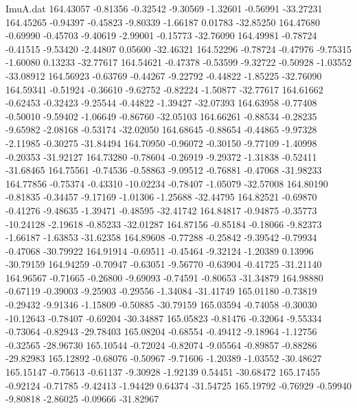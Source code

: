 \begin{filecontents}{ImuA.dat}
 164.43057   -0.81356   -0.32542   -9.30569   -1.32601   -0.56991  -33.27231
 164.45265   -0.94397   -0.45823   -9.80339   -1.66187    0.01783  -32.85250
 164.47680   -0.69990   -0.45703   -9.40619   -2.99001   -0.15773  -32.76090
 164.49981   -0.78724   -0.41515   -9.53420   -2.44807    0.05600  -32.46321
 164.52296   -0.78724   -0.47976   -9.75315   -1.60080    0.13233  -32.77617
 164.54621   -0.47378   -0.53599   -9.32722   -0.50928   -1.03552  -33.08912
 164.56923   -0.63769   -0.44267   -9.22792   -0.44822   -1.85225  -32.76090
 164.59341   -0.51924   -0.36610   -9.62752   -0.82224   -1.50877  -32.77617
 164.61662   -0.62453   -0.32423   -9.25544   -0.44822   -1.39427  -32.07393
 164.63958   -0.77408   -0.50010   -9.59402   -1.06649   -0.86760  -32.05103
 164.66261   -0.88534   -0.28235   -9.65982   -2.08168   -0.53174  -32.02050
 164.68645   -0.88654   -0.44865   -9.97328   -2.11985   -0.30275  -31.84494
 164.70950   -0.96072   -0.30150   -9.77109   -1.40998   -0.20353  -31.92127
 164.73280   -0.78604   -0.26919   -9.29372   -1.31838   -0.52411  -31.68465
 164.75561   -0.74536   -0.58863   -9.09512   -0.76881   -0.47068  -31.98233
 164.77856   -0.75374   -0.43310  -10.02234   -0.78407   -1.05079  -32.57008
 164.80190   -0.81835   -0.34457   -9.17169   -1.01306   -1.25688  -32.44795
 164.82521   -0.69870   -0.41276   -9.48635   -1.39471   -0.48595  -32.41742
 164.84817   -0.94875   -0.35773  -10.24128   -2.19618   -0.85233  -32.01287
 164.87156   -0.85184   -0.18066   -9.82373   -1.66187   -1.63853  -31.62358
 164.89608   -0.77288   -0.25842   -9.39542   -0.79934   -0.47068  -30.79922
 164.91914   -0.69511   -0.45464   -9.32124   -1.20389    0.13996  -30.79159
 164.94259   -0.70947   -0.63051   -9.56770   -0.63904   -0.41725  -31.21140
 164.96567   -0.71665   -0.26800   -9.69093   -0.74591   -0.80653  -31.34879
 164.98880   -0.67119   -0.39003   -9.25903   -0.29556   -1.34084  -31.41749
 165.01180   -0.73819   -0.29432   -9.91346   -1.15809   -0.50885  -30.79159
 165.03594   -0.74058   -0.30030  -10.12643   -0.78407   -0.69204  -30.34887
 165.05823   -0.81476   -0.32064   -9.55334   -0.73064   -0.82943  -29.78403
 165.08204   -0.68554   -0.49412   -9.18964   -1.12756   -0.32565  -28.96730
 165.10544   -0.72024   -0.82074   -9.05564   -0.89857   -0.88286  -29.82983
 165.12892   -0.68076   -0.50967   -9.71606   -1.20389   -1.03552  -30.48627
 165.15147   -0.75613   -0.61137   -9.30928   -1.92139    0.54451  -30.68472
 165.17455   -0.92124   -0.71785   -9.42413   -1.94429    0.64374  -31.54725
 165.19792   -0.76929   -0.59940   -9.80818   -2.86025   -0.09666  -31.82967

\end{filecontents}
